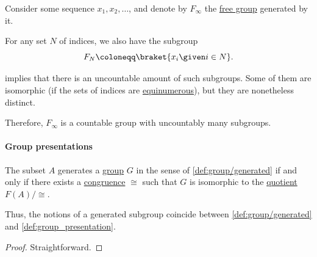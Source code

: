 \begin{example}\label{ex:free_group_with_uncountably_many_subgroups}
  Consider some sequence \( x_1, x_2, \ldots \), and denote by \( F_\infty \) the \hyperref[def:free_group]{free group} generated by it.

  For any set \( N \) of indices, we also have the subgroup
  \begin{equation*}
    F_N \coloneqq \braket{ x_i \given i \in N }.
  \end{equation*}

   implies that there is an uncountable amount of such subgroups. Some of them are isomorphic (if the sets of indices are \hyperref[def:equinumerosity]{equinumerous}), but they are nonetheless distinct.

  Therefore, \( F_\infty \) is a countable group with uncountably many subgroups.
\end{example}

\paragraph{Group presentations}

\begin{proposition}\label{thm:group_presentation_generating_set}
  The subset \( A \) generates a \hyperref[def:group]{group} \( G \) in the sense of \cref{def:group/generated} if and only if there exists a \hyperref[def:fol_congruence]{congruence} \( {\cong} \) such that \( G \) is isomorphic to the \hyperref[def:group/quotient]{quotient} \( F(A) / {\cong} \).
\end{proposition}
\begin{comments}
  \item Thus, the notions of a generated subgroup coincide between \cref{def:group/generated} and \cref{def:group_presentation}.
\end{comments}
\begin{proof}
  Straightforward.
\end{proof}

